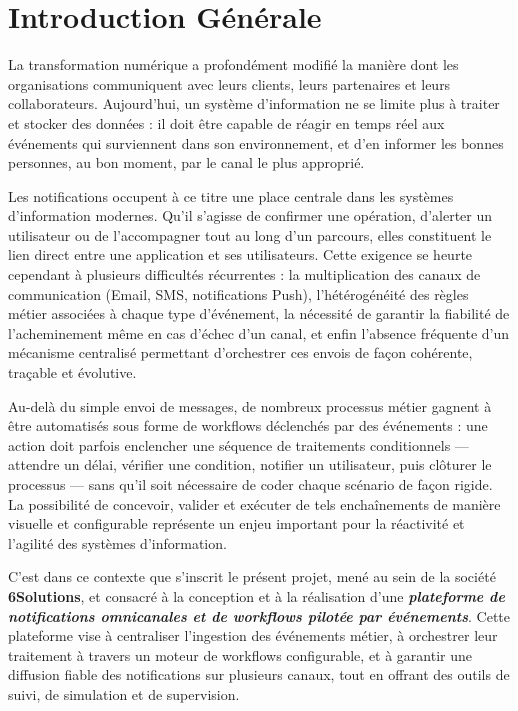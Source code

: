 \documentclass[12pt,a4paper]{report}
\begin{document}
\chapter*{Introduction Générale}

La transformation numérique a profondément modifié la manière dont les organisations communiquent avec leurs clients, leurs partenaires et leurs collaborateurs. Aujourd'hui, un système d'information ne se limite plus à traiter et stocker des données : il doit être capable de réagir en temps réel aux événements qui surviennent dans son environnement, et d'en informer les bonnes personnes, au bon moment, par le canal le plus approprié.

Les notifications occupent à ce titre une place centrale dans les systèmes d'information modernes. Qu'il s'agisse de confirmer une opération, d'alerter un utilisateur ou de l'accompagner tout au long d'un parcours, elles constituent le lien direct entre une application et ses utilisateurs. Cette exigence se heurte cependant à plusieurs difficultés récurrentes : la multiplication des canaux de communication (Email, SMS, notifications Push), l'hétérogénéité des règles métier associées à chaque type d'événement, la nécessité de garantir la fiabilité de l'acheminement même en cas d'échec d'un canal, et enfin l'absence fréquente d'un mécanisme centralisé permettant d'orchestrer ces envois de façon cohérente, traçable et évolutive.

Au-delà du simple envoi de messages, de nombreux processus métier gagnent à être automatisés sous forme de workflows déclenchés par des événements : une action doit parfois enclencher une séquence de traitements conditionnels --- attendre un délai, vérifier une condition, notifier un utilisateur, puis clôturer le processus --- sans qu'il soit nécessaire de coder chaque scénario de façon rigide. La possibilité de concevoir, valider et exécuter de tels enchaînements de manière visuelle et configurable représente un enjeu important pour la réactivité et l'agilité des systèmes d'information.

C'est dans ce contexte que s'inscrit le présent projet, mené au sein de la société \textbf{6Solutions}, et consacré à la conception et à la réalisation d'une \textbf{\textit{plateforme de notifications omnicanales et de workflows pilotée par événements}}. Cette plateforme vise à centraliser l'ingestion des événements métier, à orchestrer leur traitement à travers un moteur de workflows configurable, et à garantir une diffusion fiable des notifications sur plusieurs canaux, tout en offrant des outils de suivi, de simulation et de supervision.
\end{document}
